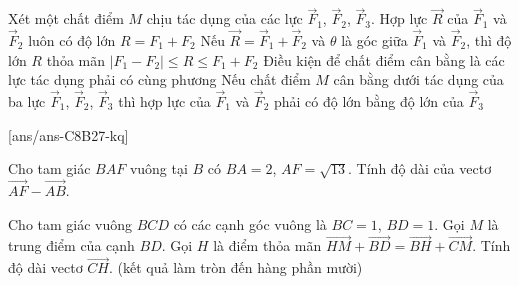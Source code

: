 \begin{ex}%
	Xét một chất điểm $M$ chịu tác dụng của các lực $\overrightarrow{F}_1$, $\overrightarrow{F}_2$, $\overrightarrow{F}_3$.
	\choiceTF
	{Hợp lực $\overrightarrow{R}$ của $\overrightarrow{F}_1$ và $\overrightarrow{F}_2$ luôn có độ lớn $R = F_1 + F_2$}
	{\True Nếu $\overrightarrow{R} = \overrightarrow{F}_1 + \overrightarrow{F}_2$ và $\theta$ là góc giữa $\overrightarrow{F}_1$ và $\overrightarrow{F}_2$, thì độ lớn $R$ thỏa mãn $|F_1 - F_2| \le R \le F_1 + F_2$}
	{Điều kiện để chất điểm cân bằng là các lực tác dụng phải có cùng phương}
	{\True Nếu chất điểm $M$ cân bằng dưới tác dụng của ba lực $\overrightarrow{F}_1$, $\overrightarrow{F}_2$, $\overrightarrow{F}_3$ thì hợp lực của $\overrightarrow{F}_1$ và $\overrightarrow{F}_2$ phải có độ lớn bằng độ lớn của $\overrightarrow{F}_3$}
\end{ex}
 
\setcounter{ex}{0}
[ans/ans-C8B27-kq]
\begin{ex}%
	Cho tam giác ${BAF}$ vuông tại ${B}$ có $BA=2$, $AF=\sqrt{13}$. Tính độ dài của vectơ $\overrightarrow{AF}-\overrightarrow{AB}$.
\end{ex}
\begin{ex}%
	Cho tam giác vuông ${BCD}$ có các cạnh góc vuông là $BC=1$, $BD=1$. Gọi ${M}$ là trung điểm của cạnh $BD$. Gọi ${H}$ là điểm thỏa mãn $\overrightarrow{HM}+\overrightarrow{BD}=\overrightarrow{BH}+\overrightarrow{CM}$. Tính độ dài vectơ $\overrightarrow{CH}$. (kết quả làm tròn đến hàng phần mười)
\end{ex}

